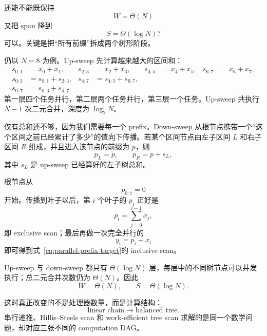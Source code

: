还能不能既保持
\begin{equation}
W=\Theta(N)
\end{equation}
又把 span 降到
\begin{equation}
S=\Theta(\log N)?
\end{equation}
可以。关键是把“所有前缀”拆成两个树形阶段。

仍以 $N=8$ 为例。Up-sweep 先计算越来越大的区间和：
\begin{align}
s_{0:1}&=x_0+x_1,
&
s_{2:3}&=x_2+x_3,
&
s_{4:5}&=x_4+x_5,
&
s_{6:7}&=x_6+x_7,
\\
s_{0:3}&=s_{0:1}+s_{2:3},
&
s_{4:7}&=s_{4:5}+s_{6:7},
\\
s_{0:7}&=s_{0:3}+s_{4:7}.
\end{align}
第一层四个任务并行，第二层两个任务并行，第三层一个任务。Up-sweep 共执行 $N-1$ 次二元合并，深度为 $\log_2N$。

仅有总和还不够，因为我们需要每一个 prefix。Down-sweep 从根节点携带一个“这个区间之前已经累计了多少”的值向下传播。若某个区间节点由左子区间 $L$ 和右子区间 $R$ 组成，并且进入该节点的前缀为 $p$，则
\begin{equation}
p_L=p,
\qquad
p_R=p+s_L,
\label{eq:parallel-downsweep-rule}
\end{equation}
其中 $s_L$ 是 up-sweep 已经算好的左子树总和。

根节点从
\begin{equation}
p_{0:7}=0
\end{equation}
开始。传播到叶子以后，第 $i$ 个叶子的 $p_i$ 正好是
\begin{equation}
p_i=\sum_{j=0}^{i-1}x_j,
\end{equation}
即 exclusive scan；最后再做一次完全并行的
\begin{equation}
y_i=p_i+x_i
\end{equation}
即可得到式~\eqref{eq:parallel-prefix-target}的 inclusive scan。

Up-sweep 与 down-sweep 都只有 $\Theta(\log N)$ 层，每层中的不同树节点可以并发执行；总二元合并次数仍为 $\Theta(N)$。因此
\begin{equation}
\boxed{
W=\Theta(N),
\qquad
S=\Theta(\log N).
}
\label{eq:parallel-work-efficient-scan}
\end{equation}

这时真正改变的不是处理器数量，而是计算结构：
\begin{equation}
\boxed{
\text{linear chain}
\rightarrow
\text{balanced tree}.
}
\label{eq:parallel-chain-to-tree}
\end{equation}
串行递推、Hillis--Steele scan 和 work-efficient tree scan 求解的是同一个数学问题，却对应三张不同的 computation DAG。

